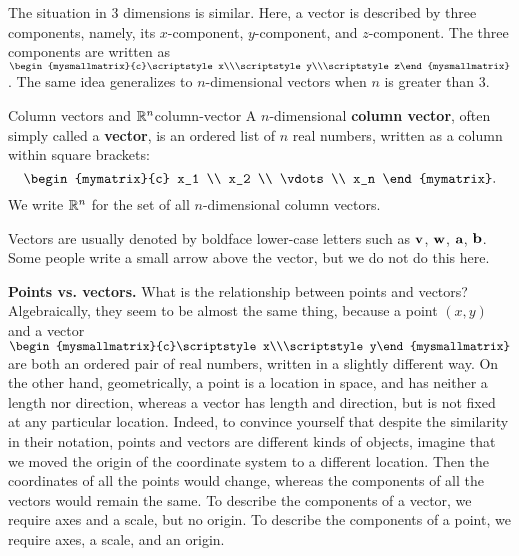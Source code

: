 The situation in $3$ dimensions is similar. Here, a vector is
described by three components, namely, its $x$-component,
$y$-component, and $z$-component. The three components are written as
$\begin{mysmallmatrix}{c}\scriptstyle x\\\scriptstyle y\\\scriptstyle
  z\end{mysmallmatrix}$. The same idea generalizes to $n$-dimensional
vectors when $n$ is greater than $3$. 

\begin{definition}{Column vectors and $\mathbb{R}^n$}{column-vector}
  A $n$-dimensional
  \textbf{column vector},
  often simply called a \textbf{vector}, is an ordered list
  of $n$ real numbers, written as a column within square brackets:
  \begin{equation*}
    \begin{mymatrix}{c}
      x_1 \\
      x_2 \\
      \vdots \\
      x_n
    \end{mymatrix}.
  \end{equation*}
  We write $\mathbb{R}^n$ for the set of all $n$-dimensional
  column vectors.
\end{definition}
Vectors are usually denoted by boldface lower-case letters such as
$\mbox{\bf v}$, $\mbox{\bf w}$, $\mbox{\bf a}$, $\mbox{\bf b}$. Some people write a
small arrow above the vector, but we do not do this here.
\bigskip

\noindent\textbf{Points vs. vectors.}
What is the relationship between points and vectors? Algebraically,
they seem to be almost the same thing, because a point $(x,y)$ and a
vector
$\begin{mysmallmatrix}{c}\scriptstyle x\\\scriptstyle
  y\end{mysmallmatrix}$ are both an ordered pair of real numbers,
written in a slightly different way. On the other hand, geometrically,
a point is a location in space, and has neither a length nor
direction, whereas a vector has length and direction, but is not fixed
at any particular location. Indeed, to convince yourself that despite
the similarity in their notation, points and vectors are different
kinds of objects, imagine that we moved the origin of the coordinate
system to a different location. Then the coordinates of all the points
would change, whereas the components of all the vectors would remain
the same. To describe the components of a vector, we require axes and
a scale, but no origin. To describe the components of a point, we
require axes, a scale, and an origin.  \bigskip

